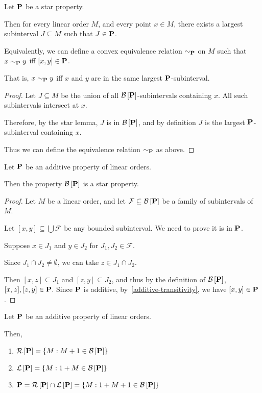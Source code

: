 \begin{lemma}
  Let $\mathbf{P}$ be a star property.

  Then for every linear order $M$,
  and every point $x \in M$, there exists a largest subinterval $J \subseteq M$ such that
  $J \in \mathbf{P}$.

  Equivalently, we can define a convex equivalence relation $\sim_{\mathbf{P}}$ on $M$ such that $x \sim_{\mathbf{P}} y$ iff $[x, y] \in \mathbf{P}$.

  That is,
  $x \sim_{\mathbf{P}} y$ iff $x$ and $y$ are in the same largest $\mathbf{P}$-subinterval.

\end{lemma}

\begin{proof}
  Let $J \subseteq M$ be the union of all $\mathcal{B} \left[ {{\mathbf{P}}} \right]$-subintervals containing $x$.
  All such subintervals intersect at $x$.

  Therefore, by the star lemma, $J$ is in $\mathcal{B} \left[ {{\mathbf{P}}} \right]$, and by definition
  $J$ is the largest $\mathbf{P}$-subinterval containing $x$.

  Thus we can define the equivalence relation $\sim_{\mathbf{P}}$ as above.
\end{proof}

\begin{lemma}\label{star-lemma}
  Let $\mathbf{P}$ be an additive property of linear orders.

  Then the property $\mathcal{B} \left[ {{\mathbf{P}}} \right]$ is a star property.
\end{lemma}

\begin{proof}
  Let $M$ be a linear order,
  and let $\mathcal{F} \subseteq \mathcal{B} \left[ {{\mathbf{P}}} \right]$ be a family of subintervals of $M$.

  Let $[x, y] \subseteq \bigcup \mathcal{F}$ be any bounded subinterval. We need to prove
  it is in $\mathbf{P}$.

  Suppose $x \in J_1$ and $y \in J_2$ for $J_1, J_2 \in \mathcal{F}$.

  Since $J_1 \cap J_2 \ne \emptyset$, we can take $z \in J_1 \cap J_2$.

  Then $[x, z] \subseteq J_1$ and $[z, y] \subseteq J_2$,
  and thus by the definition of $\mathcal{B} \left[ {{\mathbf{P}}} \right]$, $[x, z], [z, y] \in \mathbf{P}$.
  Since $\mathbf{P}$ is additive, by~\cref{additive-transitivity}, we have $[x, y] \in \mathbf{P}$.
\end{proof}

\begin{lemma}\label{bounded-properties}
  Let $\mathbf{P}$ be an additive property of linear orders.

  Then,
  \begin{enumerate}
    \item $\mathcal{R} \left[ {{\mathbf{P}}} \right] = \left\{ {M : M + 1 \in \mathcal{B} \left[ {{\mathbf{P}}} \right]} \right\}$
    \item $\mathcal{L} \left[ {{\mathbf{P}}} \right] = \left\{ {M : 1 + M \in \mathcal{B} \left[ {{\mathbf{P}}} \right]} \right\}$
    \item $\mathbf{P} = \mathcal{R} \left[ {{\mathbf{P}}} \right] \cap \mathcal{L} \left[ {{\mathbf{P}}} \right] = \left\{ {M : 1 + M + 1 \in \mathcal{B} \left[ {{\mathbf{P}}} \right]} \right\}$
  \end{enumerate}
\end{lemma}

